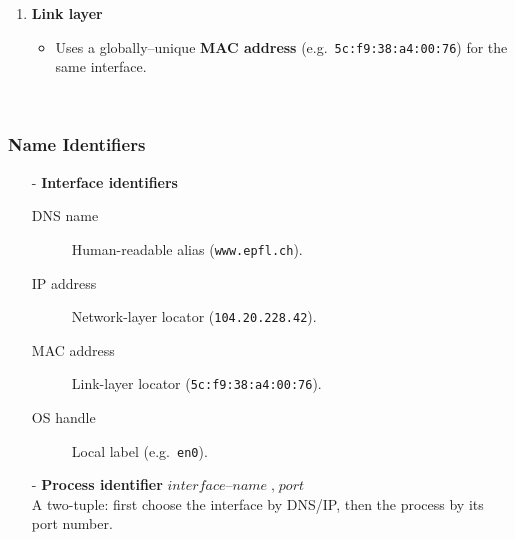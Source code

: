 \documentclass[../../compsys.tex]{subfiles}
\begin{document}
\begin{example}
\begin{minipage}[htp]{0.45\textwidth}
\begin{enumerate}
    \item \textbf{Link layer}  
          \begin{itemize}
            \item Uses a globally–unique \textbf{MAC address}
                  (e.g.\ \texttt{5c:f9:38:a4:00:76}) for the same
                  interface.
          \end{itemize}
  \end{enumerate}
  \end{minipage}\\
  \end{example}
  \subsubsection{Name Identifiers}\label{subsec:names}
  \begin{itemize}
    \item[-] \textbf{Interface identifiers}  
          \begin{description}
            \item[DNS name] Human-readable alias
                  (\texttt{www.epfl.ch}).
            \item[IP address] Network-layer locator
                  (\texttt{104.20.228.42}).
            \item[MAC address] Link-layer locator
                  (\texttt{5c:f9:38:a4:00:76}).
            \item[OS handle] Local label (e.g.\ \texttt{en0}).
          \end{description}
    \item[-] \textbf{Process identifier} $
            \textit{interface–name} \; , \; \textit{port}
          $\\
          A two-tuple: first choose the interface by DNS/IP, then the
          process by its port number.
  \end{itemize}
  

  
\end{document}
